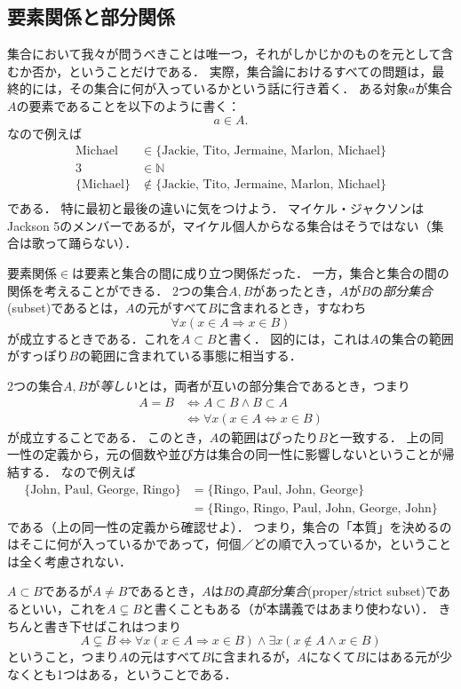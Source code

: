 \documentclass[11pt,a4paper]{jsarticle}
\begin{document}
\subsection{要素関係と部分関係}
集合において我々が問うべきことは唯一つ，それがしかじかのものを元として含むか否か，ということだけである．
実際，集合論におけるすべての問題は，最終的には，その集合に何が入っているかという話に行き着く．
ある対象$a$が集合$A$の要素であることを以下のように書く：
\[
 a \in A.
\]
なので例えば
\begin{align*}
\text{Michael} &\in \{ \text{Jackie, Tito, Jermaine, Marlon, Michael}\}  \\
3 &\in \mathbb{N} \\
\{ \text{Michael} \} &\not\in \{ \text{Jackie, Tito, Jermaine, Marlon, Michael}\}  \\
\end{align*}
である．
特に最初と最後の違いに気をつけよう．
マイケル・ジャクソンはJackson 5のメンバーであるが，マイケル個人からなる集合はそうではない（集合は歌って踊らない）．

要素関係$\in$は要素と集合の間に成り立つ関係だった．
一方，集合と集合の間の関係を考えることができる．
2つの集合$A, B$があったとき，$A$が$B$の\emph{部分集合}(subset)であるとは，$A$の元がすべて$B$に含まれるとき，すなわち
\[
 \forall x (x \in A \Rightarrow x \in B)
\]
が成立するときである．これを$A \subset B$と書く．
図的には，これは$A$の集合の範囲がすっぽり$B$の範囲に含まれている事態に相当する．

2つの集合$A,B$が\emph{等しい}とは，両者が互いの部分集合であるとき，つまり
\begin{align*}
 A = B &\iff A \subset B \wedge B \subset A \\
&\iff \forall x (x \in A \iff x \in B)
\end{align*}
 が成立することである．
このとき，$A$の範囲はぴったり$B$と一致する．
上の同一性の定義から，{元の個数や並び方は集合の同一性に影響しない}ということが帰結する．
なので例えば
\begin{align*}
 \{\text{John, Paul, George, Ringo}\} 
 &= \{\text{Ringo, Paul, John, George}\} \\
 &= \{\text{Ringo, Ringo, Paul, John, George, John}\}
\end{align*}
である（上の同一性の定義から確認せよ）．
つまり，集合の「本質」を決めるのはそこに何が入っているかであって，何個／どの順で入っているか，ということは全く考慮されない．

$A \subset B$であるが$A \neq B$であるとき，$A$は$B$の\emph{真部分集合}(proper/strict subset)であるといい，これを$A \subsetneq B$と書くこともある（が本講義ではあまり使わない）．
きちんと書き下せばこれはつまり
\[
A \subsetneq B \iff \forall x (x \in A \Rightarrow x \in B) \wedge \exists x (x \not\in A \wedge x \in B)
\]
ということ，つまり$A$の元はすべて$B$に含まれるが，$A$になくて$B$にはある元が少なくとも1つはある，ということである．
\end{document}
